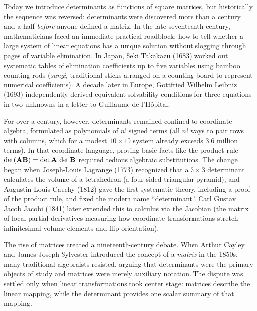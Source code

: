 \begin{historybox}
Today we introduce determinants as functions of square matrices, but historically the sequence was reversed: determinants were discovered more than a century and a half \emph{before} anyone defined a matrix. In the late seventeenth century, mathematicians faced an immediate practical roadblock: how to tell whether a large system of linear equations has a unique solution without slogging through pages of variable elimination. In Japan, Seki Takakazu (1683) worked out systematic tables of elimination coefficients up to five variables using bamboo counting rods (\emph{sangi}, traditional sticks arranged on a counting board to represent numerical coefficients). A decade later in Europe, Gottfried Wilhelm Leibniz (1693) independently derived equivalent solvability conditions for three equations in two unknowns in a letter to Guillaume de l'H\^opital.

For over a century, however, determinants remained confined to coordinate algebra, formulated as polynomials of $n!$ signed terms (all $n!$ ways to pair rows with columns, which for a modest $10\times 10$ system already exceeds $3.6$ million terms). In that coordinate language, proving basic facts like the product rule $\det(\mathbf{A}\mathbf{B}) = \det\mathbf{A}\,\det\mathbf{B}$ required tedious algebraic substitutions. The change began when Joseph-Louis Lagrange (1773) recognized that a $3\times 3$ determinant calculates the volume of a tetrahedron (a four-sided triangular pyramid), and Augustin-Louis Cauchy (1812) gave the first systematic theory, including a proof of the product rule, and fixed the modern name ``determinant''. Carl Gustav Jacob Jacobi (1841) later extended this to calculus via the Jacobian (the matrix of local partial derivatives measuring how coordinate transformations stretch infinitesimal volume elements and flip orientation).

The rise of matrices created a nineteenth-century debate. When Arthur Cayley and James Joseph Sylvester introduced the concept of a \emph{matrix} in the 1850s, many traditional algebraists resisted, arguing that determinants were the primary objects of study and matrices were merely auxiliary notation. The dispute was settled only when linear transformations took center stage: matrices describe the linear mapping, while the determinant provides one scalar summary of that mapping.


\end{historybox}
